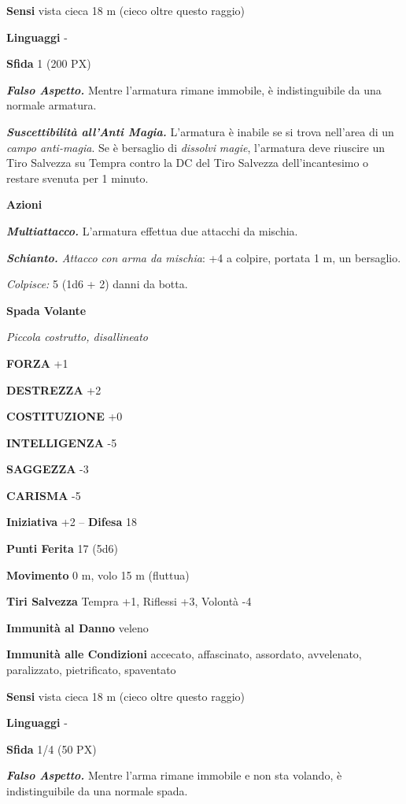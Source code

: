 \begin{multicols}{2}
	\textbf{Sensi} vista cieca 18 m (cieco oltre questo raggio)

	\textbf{Linguaggi} -

	\textbf{Sfida} 1 (200 PX)

	\textit{\textbf{Falso Aspetto.}} Mentre l'armatura rimane immobile, è indistinguibile da una normale armatura.

	\textit{\textbf{Suscettibilità all'Anti Magia.}} L'armatura è inabile se si trova nell'area di un \textit{campo anti-magia}. Se è bersaglio di \textit{dissolvi} \textit{magie}, l'armatura deve riuscire un Tiro Salvezza su Tempra contro la DC del Tiro Salvezza dell'incantesimo o restare svenuta per 1 minuto.

	\textbf{Azioni}

	\textit{\textbf{Multiattacco.}} L'armatura effettua due attacchi da mischia.

	\textit{\textbf{Schianto.} Attacco con arma da mischia}: +4 a colpire, portata 1 m, un bersaglio.

	\textit{Colpisce:} 5 (1d6 + 2) danni da botta.

	\medskip{}\textbf{Spada Volante}

	\textit{Piccola costrutto, disallineato}

	\textbf{FORZA} +1

	\textbf{DESTREZZA} +2

	\textbf{COSTITUZIONE} +0

	\textbf{INTELLIGENZA} -5

	\textbf{SAGGEZZA} -3

	\textbf{CARISMA} -5

	\textbf{Iniziativa} +2 -- \textbf{Difesa} 18

	\textbf{Punti Ferita} 17 (5d6)

	\textbf{Movimento} 0 m, volo 15 m (fluttua)

	\textbf{Tiri Salvezza} Tempra +1, Riflessi +3, Volontà -4

	\textbf{Immunità al Danno} veleno

	\textbf{Immunità alle Condizioni} accecato, affascinato, assordato, avvelenato, paralizzato, pietrificato, spaventato

	\textbf{Sensi} vista cieca 18 m (cieco oltre questo raggio)

	\textbf{Linguaggi} -

	\textbf{Sfida} 1/4 (50 PX)

	\textit{\textbf{Falso Aspetto.}} Mentre l'arma rimane immobile e non sta volando, è indistinguibile da una normale spada.


\end{multicols}
